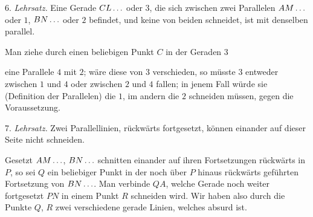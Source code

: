 6. \emph{Lehrsatz.} Eine Gerade $CL\mathinner{.\,.\,.}$ oder $3$, die sich zwischen zwei Parallelen $AM\mathinner{.\,.\,.}$ oder $1$, $BN\mathinner{.\,.\,.}$ oder $2$ befindet, und keine von beiden schneidet, ist mit denselben parallel.

 Man ziehe durch einen beliebigen Punkt $C$ in der Geraden $3$

\begin{center}

\end{center}
\noindent eine Parallele $4$ mit $2$; wäre diese von $3$ verschieden, so müsste $3$ entweder zwischen $1$ und $4$ oder zwischen $2$ und $4$ fallen; in jenem Fall würde sie (Definition der Parallelen) die $1$, im andern die $2$ schneiden müssen, gegen die Voraussetzung.

7. \emph{Lehrsatz.} Zwei Parallellinien, rückwärts fortgesetzt, können einander auf dieser Seite nicht schneiden.

\begin{center}

\end{center}

 Gesetzt $AM\mathinner{.\,.\,.}$, $BN\mathinner{.\,.\,.}$ schnitten einander auf ihren Fortsetzungen rückwärts in $P$, so sei $Q$ ein beliebiger Punkt in der noch über $P$ hinaus rückwärts geführten Fortsetzung von $BN\mathinner{.\,.\,.}$. Man verbinde $QA$, welche Gerade noch weiter fortgesetzt $PN$ in einem Punkt $R$ schneiden wird. Wir haben also durch die Punkte $Q$, $R$ zwei verschiedene gerade Linien, welches absurd ist.

